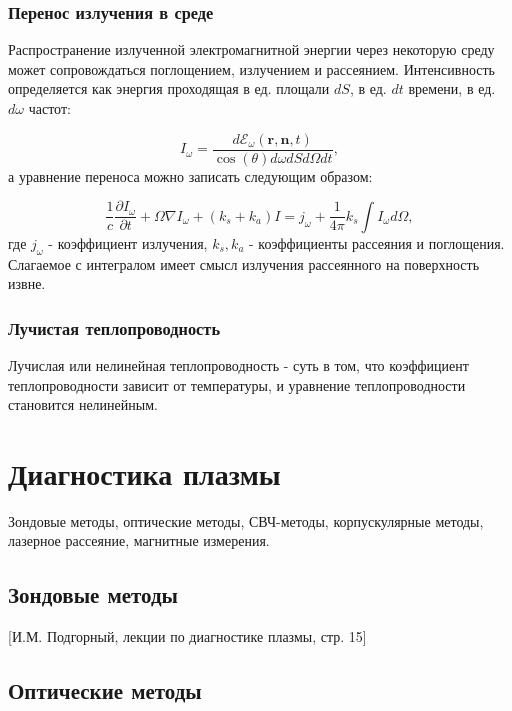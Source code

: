 \documentclass[10pt, a4paper]{article}
\let\stdsection\section
\renewcommand\section{\newpage\stdsection}
\begin{document}
\subsubsection{Перенос излучения в среде}
Распространение излученной электромагнитной энергии через некоторую среду может сопровождаться поглощением, излучением и рассеянием. Интенсивность определяется как энергия проходящая в ед. площали $dS$, в ед. $dt$ времени, в ед. $d\omega$ частот:

\begin{equation}
    I_{\omega} = \frac{d\mathcal{E}_{\omega}(\mathbf{r},\mathbf{n},t)}{\cos(\theta)d\omega dSd\Omega dt},
\end{equation}
а уравнение переноса можно записать следующим образом:

\begin{equation}
    \frac{1}{c} \frac{\partial I_{\omega}}{\partial t} + \mathcal{\Omega}\nabla I_{\omega} + (k_s + k_a) I = j_{\omega} + \frac{1}{4\pi} k_s \int I_{\omega} d\Omega,
\end{equation}
где $j_{\omega}$ - коэффициент излучения, $k_s, k_a$ - коэффициенты рассеяния и поглощения. Слагаемое с интегралом имеет смысл излучения рассеянного на поверхность извне.

\subsubsection{Лучистая теплопроводность}

Лучислая или нелинейная теплопроводность - суть в том, что коэффициент теплопроводности зависит от температуры, и уравнение теплопроводности становится нелинейным.


\section{Диагностика плазмы}

Зондовые методы, оптические методы, СВЧ-методы, корпускулярные методы, лазерное рассеяние, магнитные измерения.

\subsection{Зондовые методы}

[И.М. Подгорный, лекции по диагностике плазмы, стр. 15]

\subsection{Оптические методы}
\end{document}
